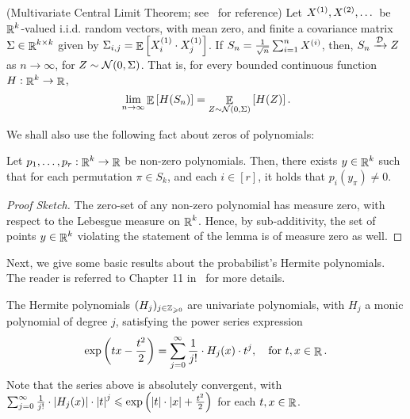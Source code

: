 \begin{theorem}\label{thm:multi_clt} (Multivariate Central Limit Theorem; see~\cite{Dur19} for reference)
Let $X^{\left( 1 \right)},X^{\left( 2 \right)},\dots$ be $\mathop{\mathbb{R}}^k$-valued i.i.d. random vectors, with mean zero, and finite a covariance matrix $\Sigma \in \mathop{\mathbb{R}}^{k\times k}$ given by $\Sigma_{i,j} = \mathop{\mathbb{E}}\left[ X^{\left( 1 \right)}_i\cdot X^{\left( 1 \right)}_j \right]$.
If $S_n = \frac{1}{\sqrt n} \sum_{i=1}^n X^{\left( i \right)}$, then, $S_n \xrightarrow{\mathcal D} Z$ as $n\to \infty$, for $Z\sim  \mathcal N(0, \Sigma)$.
That is, for every bounded continuous function $H:\mathop{\mathbb{R}}^k\to \mathop{\mathbb{R}}$, \[\lim_{n\to \infty} \mathop{\mathbb{E}}\left[ H(S_n) \right] = \mathop{\mathbb{E}}_{Z\sim \mathcal N(0,\Sigma)}\left[ H(Z) \right].\]
	
\end{theorem}

We shall also use the following fact about zeros of polynomials:
\begin{lemma}\label{lemma:dim_var}
	Let $p_1,\dots,p_r:\mathop{\mathbb{R}}^k\to \mathop{\mathbb{R}}$ be non-zero polynomials.
	Then, there exists $y\in \mathop{\mathbb{R}}^k$ such that for each permutation $\pi\in S_k$, and each $i\in [r]$, it holds that $p_i(y_\pi) \not= 0$.
\end{lemma}
\begin{proof}[Proof Sketch]
	The zero-set of any non-zero polynomial has measure zero, with respect to the Lebesgue measure on $\mathop{\mathbb{R}}^k$.
	Hence, by sub-additivity, the set of points $y\in \mathop{\mathbb{R}}^k$ violating the statement of the lemma is of measure zero as well.
\end{proof}


Next, we give some basic results about the probabilist's Hermite polynomials. The reader is referred to Chapter 11 in~\cite{Don14} for more details. 

\begin{definition}\label{defn:hermite_poly}
	The Hermite polynomials $(H_j)_{j\in \mathbb{Z}_{\geqslant 0}}$ are univariate polynomials, with $H_j$ a monic polynomial of degree $j$, satisfying the power series expression
	\[ \exp\left( tx-\frac{t^2}{2} \right) = \sum_{j=0}^\infty \frac{1}{j!}\cdot H_j(x)\cdot t^j, \quad \text{for } t,x\in \mathop{\mathbb{R}}. \]
	Note that the series above is absolutely convergent, with $  \sum_{j=0}^\infty \frac{1}{j!}\cdot \left|H_j(x)\right|\cdot \left|t\right|^j \leqslant  \exp\left( \left|t\right|\cdot \left|x\right|+\frac{t^2}{2} \right)$ for each $t,x\in \mathop{\mathbb{R}}$.
\end{definition}

